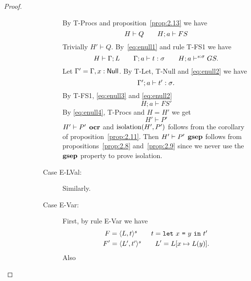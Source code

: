\begin{proof}
\begin{description}
\begin{description}
\begin{description}
              By {\sc T-Procs} and proposition~\ref{prop:2.13} we have 
              \begin{equation} \label{eq:enull1}
               H \vdash Q  \quad\quad H; a \vdash FS 
              \end{equation}
              Trivially $H' \vdash Q$. 
              By~\eqref{eq:enull1} and rule {\sc T-FS1} we have
              \begin{equation} \label{eq:enull2}
                H \vdash \Gamma; L \quad\quad \mbox{$\Gamma;a\vdash t:\sigma$}
                \quad\quad H; a \vdash^{s: \sigma} GS.
              \end{equation}
              Let $\Gamma' = \Gamma, x: \mbox{$\mathsf{Null}$}$. By {\sc T-Let}, {\sc
              T-Null} and \eqref{eq:enull2} we have
              \begin{equation} \label{eq:enull3}
                \mbox{$\Gamma';a\vdash t':\sigma$}.
              \end{equation}
              By {\sc T-FS1}, \eqref{eq:enull3} and \eqref{eq:enull2}
              \begin{equation}\label{eq:enull4}
                H;a \vdash FS'
              \end{equation}
              By \eqref{eq:enull4}, {\sc T-Procs} and $H = H'$ we get  
              \begin{equation}
                H' \vdash P'
              \end{equation}
              $H' \vdash P' \:\: \mbox{\bf ocr}$ and $\mbox{$\mathrm{isolation}$}{(H', P')}$ follows from
              the corollary of proposition~\ref{prop:2.11}. Then $H' \vdash P'
              \:\: \mbox{\bf gsep}$ follows from propositions~\ref{prop:2.8}
              and~\ref{prop:2.9} since we never use the $\mbox{\bf gsep}$ property to
              prove isolation.
            \item[Case {\sc E-LVal}:] Similarly.
            \item[Case {\sc E-Var}:] First, by rule {\sc E-Var} we have
              \begin{equation*} 
                \begin{gathered}
                  F = \mbox{$\langle L, t \rangle^s$} \quad\quad t = \mbox{\texttt{let}~$x$~\texttt{=}~$y$~\texttt{in}~$t'$} \\ 
                  F' = \mbox{$\langle L', t' \rangle^s$} \quad\quad L' = L[x \mapsto L(y)].
                \end{gathered}
              \end{equation*}
              Also
              \begin{equation} \label{eq:evar1}

\end{equation}
\end{description}
\end{description}
\end{description}
\end{proof}
